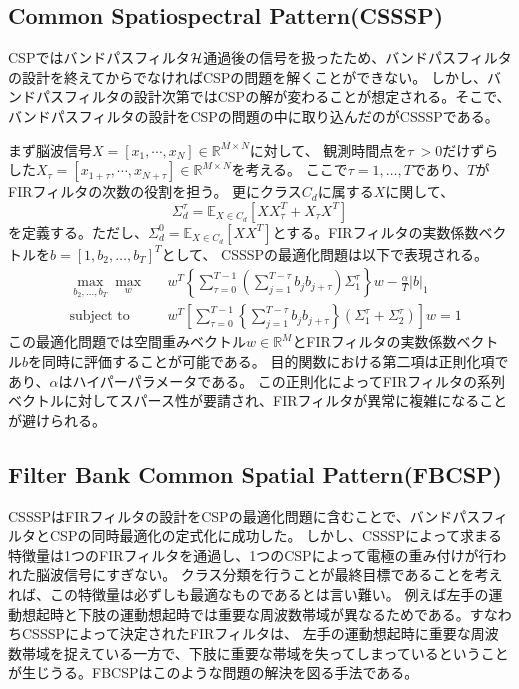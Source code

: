 \subsection{Common Spatiospectral Pattern(CSSSP)}
CSPではバンドパスフィルタ\(\cal H\)通過後の信号を扱ったため、バンドパスフィルタの設計を終えてからでなければCSPの問題を解くことができない。
しかし、バンドパスフィルタの設計次第ではCSPの解が変わることが想定される。そこで、バンドパスフィルタの設計をCSPの問題の中に取り込んだのがCSSSP\cite{csssp}である。

まず脳波信号\(X = \left[ x_1, \cdots, x_N \right] \in \mathbb{R}^{M \times N}\)に対して、
観測時間点を\(\tau\ > 0\)だけずらした\(X_{\tau} = \left[ x_{1+\tau}, \cdots, x_{N+\tau} \right] \in \mathbb{R}^{M \times N}\)を考える。
ここで$\tau = 1,\ldots,T$であり、$T$がFIRフィルタの次数の役割を担う。
更にクラス\( C_d \)に属する\( X \)に関して、
\begin{equation}
    \Sigma_{d}^{\tau} = \mathbb E_{X \in C_d} \left[ XX_{\tau}^T + X_{\tau}X^T \right]
\end{equation}
を定義する。ただし、\( \Sigma_{d}^{0} = \mathbb E_{X \in C_d} \left[XX^T \right] \)とする。FIRフィルタの実数係数ベクトルを$b=[1,b_2,\ldots,b_T]^T$として、
CSSSPの最適化問題は以下で表現される。
\begin{equation}
    \begin{aligned}
    & \max_{b_2,\ldots,b_T} \max_{w}
    & & w^T \left\{ \sum_{\tau = 0}^{T-1} \left( \sum_{j=1}^{T-\tau} b_j b_{j+\tau} \right) \Sigma_1^{\tau} \right\} w - \frac{\alpha}{T}|b|_1 \\
    & \text{subject to}
    & &  w^T \left[\sum_{\tau = 0}^{T-1} \left\{ \sum_{j=1}^{T-\tau}b_jb_{j+\tau} \right\} (\Sigma_1^{\tau} + \Sigma_2^{\tau}) \right] w = 1
    \end{aligned}
\end{equation}
この最適化問題では空間重みベクトル\(w \in \mathbb R^M\)とFIRフィルタの実数係数ベクトル$b$を同時に評価することが可能である。
目的関数における第二項は正則化項であり、$\alpha$はハイパーパラメータである。
この正則化によってFIRフィルタの系列ベクトルに対してスパース性が要請され、FIRフィルタが異常に複雑になることが避けられる。


\subsection{Filter Bank Common Spatial Pattern(FBCSP)}
CSSSPはFIRフィルタの設計をCSPの最適化問題に含むことで、バンドパスフィルタとCSPの同時最適化の定式化に成功した。
しかし、CSSSPによって求まる特徴量は1つのFIRフィルタを通過し、1つのCSPによって電極の重み付けが行われた脳波信号にすぎない。
クラス分類を行うことが最終目標であることを考えれば、この特徴量は必ずしも最適なものであるとは言い難い。
例えば左手の運動想起時と下肢の運動想起時では重要な周波数帯域が異なるためである。すなわちCSSSPによって決定されたFIRフィルタは、
左手の運動想起時に重要な周波数帯域を捉えている一方で、下肢に重要な帯域を失ってしまっているということが生じうる。FBCSPはこのような問題の解決を図る手法である。

